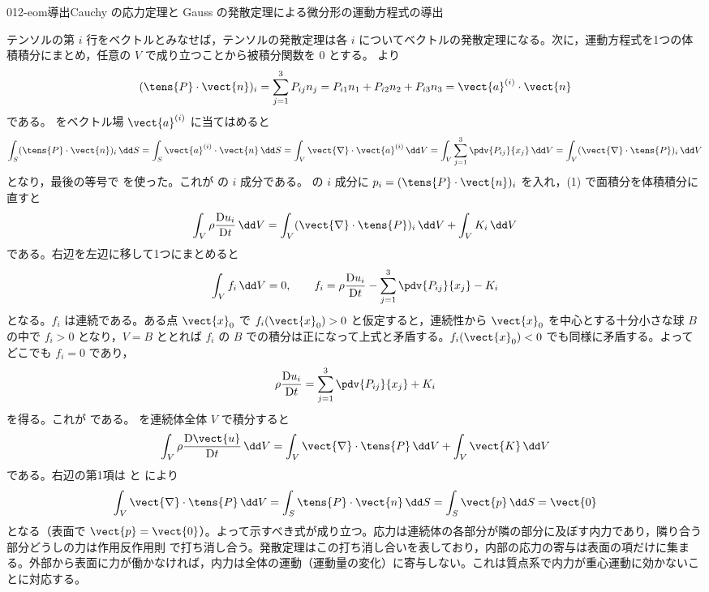 \documentclass[uplatex,dvipdfmx,a4paper,11pt]{jsarticle}
\begin{document}
\begin{mondai}{012-eom}{導出}{Cauchy の応力定理と Gauss の発散定理による微分形の運動方程式の導出}
\begin{tadashii}
\houshin テンソルの第 $i$ 行をベクトルとみなせば，テンソルの発散定理は各 $i$ についてベクトルの発散定理になる。次に，運動方程式を1つの体積積分にまとめ，任意の $V$ で成り立つことから被積分関数を $0$ とする。
\keisan {}  より
\[ (\tens{P}\cdot\vect{n})_i=\sum_{j=1}^{3}P_{ij}n_j=P_{i1}n_1+P_{i2}n_2+P_{i3}n_3=\vect{a}^{(i)}\cdot\vect{n} \]
である。 をベクトル場 $\vect{a}^{(i)}$ に当てはめると
\[ \int_S(\tens{P}\cdot\vect{n})_i\,\dd S=\int_S\vect{a}^{(i)}\cdot\vect{n}\,\dd S=\int_V\vect{\nabla}\cdot\vect{a}^{(i)}\,\dd V=\int_V\sum_{j=1}^{3}\pdv{P_{ij}}{x_j}\,\dd V=\int_V(\vect{\nabla}\cdot\tens{P})_i\,\dd V \]
となり，最後の等号で  を使った。これが  の $i$ 成分である。
  の $i$ 成分に $p_i=(\tens{P}\cdot\vect{n})_i$ を入れ，(1) で面積分を体積積分に直すと
\[ \int_V\rho\frac{\mathrm{D}u_i}{\mathrm{D}t}\,\dd V=\int_V(\vect{\nabla}\cdot\tens{P})_i\,\dd V+\int_VK_i\,\dd V \]
である。右辺を左辺に移して1つにまとめると
\[ \int_Vf_i\,\dd V=0,\qquad f_i=\rho\frac{\mathrm{D}u_i}{\mathrm{D}t}-\sum_{j=1}^{3}\pdv{P_{ij}}{x_j}-K_i \]
となる。$f_i$ は連続である。ある点 $\vect{x}_0$ で $f_i(\vect{x}_0)>0$ と仮定すると，連続性から $\vect{x}_0$ を中心とする十分小さな球 $B$ の中で $f_i>0$ となり，$V=B$ ととれば $f_i$ の $B$ での積分は正になって上式と矛盾する。$f_i(\vect{x}_0)<0$ でも同様に矛盾する。よってどこでも $f_i=0$ であり，
\[ \rho\frac{\mathrm{D}u_i}{\mathrm{D}t}=\sum_{j=1}^{3}\pdv{P_{ij}}{x_j}+K_i \]
を得る。これが  である。
  を連続体全体 $V$ で積分すると
\[ \int_V\rho\frac{\mathrm{D}\vect{u}}{\mathrm{D}t}\,\dd V=\int_V\vect{\nabla}\cdot\tens{P}\,\dd V+\int_V\vect{K}\,\dd V \]
である。右辺の第1項は  と  により
\[ \int_V\vect{\nabla}\cdot\tens{P}\,\dd V=\int_S\tens{P}\cdot\vect{n}\,\dd S=\int_S\vect{p}\,\dd S=\vect{0} \]
となる（表面で $\vect{p}=\vect{0}$）。よって示すべき式が成り立つ。応力は連続体の各部分が隣の部分に及ぼす内力であり，隣り合う部分どうしの力は作用反作用則  で打ち消し合う。発散定理はこの打ち消し合いを表しており，内部の応力の寄与は表面の項だけに集まる。外部から表面に力が働かなければ，内力は全体の運動（運動量の変化）に寄与しない。これは質点系で内力が重心運動に効かないことに対応する。

\end{tadashii}
\end{mondai}
\end{document}
